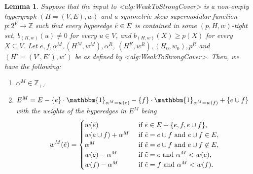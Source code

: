 \documentclass{article}
\def\Cref#1{<#1>}%
\newtheorem{lemma}{Lemma}[section]
\newcommand{\indicator}{\ensuremath{\mathbbm{1}}\xspace}
\newcommand{\knote}[1]{{\color{red}[{\tiny Karthik: \bf #1}]\marginpar{\color{red}*}}}
\newcommand{\maximalTightSetContainingHyperedge}[1]{\ensuremath{\tau_{#1}}\xspace}
\providecommand{\Z}{\mathbb{Z}}
\begin{document}
\begin{lemma}\label{lem:WeakToStrong:properties-of-alpha^M-and-alpha^R}
    Suppose that the input to \Cref{alg:WeakToStrongCover} is a non-empty hypergraph $(H = (V, E), w)$ and a symmetric skew-supermodular function $p:2^V\rightarrow \Z$ 
such that every hyperedge $\Tilde{e} \in E$ is contained in some $(p, H, w)$-tight set, $b_{(H,w)}(u) \not = 0$ for every $u \in V$, and $b_{(H,w)}(X) \geq p(X)$ for every $X \subseteq V$. 
    Let $e, f, \alpha^M, (H^M, w^M), \alpha^R$, $(H^R, w^R),(H_0, w_0), p^R$ and $(H' = (V', E'), w')$ be as defined by \Cref{alg:WeakToStrongCover}. 
    Then, we have the following:
    \begin{enumerate}[label=(\arabic*)]
        \item $\alpha^M \in \Z_+$,
        \item 
        $E^M=E-\{e\}\cdot \indicator_{\alpha^M= w(e)}- \{f\}\cdot \indicator_{\alpha^M = w(f)} + \{e\cup f\}$ with the weights of the hyperedges in $E^M$ being  
        \[
        w^M(\Tilde{e})=
        \begin{cases}
            w(\Tilde{e}) &\text { if } \Tilde{e}\in E-\{e, f, e\cup f\},\\
            w(e\cup f) + \alpha^M &\text { if } \Tilde{e}=e\cup f \text{ and } e\cup f \in E, \\
            \alpha^M &\text { if } \Tilde{e}=e\cup f \text{ and } e\cup f \not \in E, \\
            w(e) - \alpha^M &\text { if } \Tilde{e}=e \text{ and } \alpha^M<w(e), \\
            w(f) - \alpha^M &\text { if } \Tilde{e}=f \text{ and } \alpha^M<w(f).
        \end{cases}
        \]

\end{enumerate}
\end{lemma}
\end{document}
